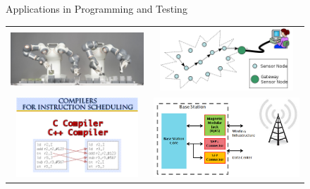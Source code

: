\documentclass{cons-beamer}
\begin{document}
\begin{frame}{Applications in Programming and Testing}
  \begin{tabular}{CC}
     \newline
    \includegraphics[width=50mm]{images/ABB-FRIDA}
    &
     \newline
    \includegraphics[width=50mm]{images/WSN}
    \\[+8mm]
     \newline
    \includegraphics[height=30mm]{images/instruction-scheduling}
    &
    \includegraphics[height=30mm]{images/baseStation}
  \end{tabular}
\end{frame}
\end{document}
